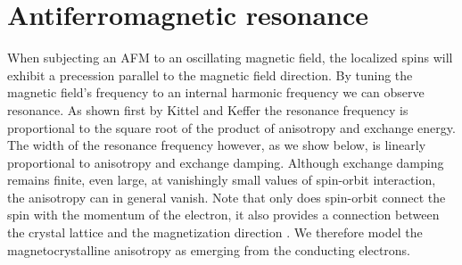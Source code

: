 %
%
\section{Antiferromagnetic resonance}
When subjecting an AFM to an oscillating magnetic field, the localized spins will exhibit a precession parallel to the magnetic field direction. By tuning the magnetic field's frequency to an internal harmonic frequency we can observe resonance. As shown first by Kittel and Keffer \cite{PhysRev.82.565, PhysRev.85.329} the resonance frequency is proportional to the square root of the product of anisotropy and exchange energy. The width of the resonance frequency however, as we show below, is linearly proportional to anisotropy and exchange damping. Although exchange damping remains finite, even large, at vanishingly small values of spin-orbit interaction, the anisotropy can in general vanish. Note that only does spin-orbit connect the spin with the momentum of the electron, it also provides a connection between the crystal lattice and the magnetization direction  \cite{hellman_interface-induced_2017, dieny_perpendicular_2017}. We therefore model the magnetocrystalline anisotropy as emerging from the conducting electrons. 

